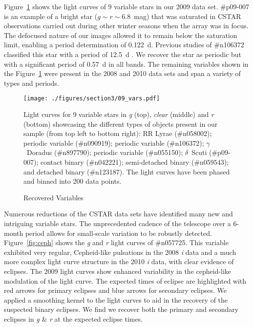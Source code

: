 Figure~\ref{fig:recover} shows the light curves of 9 variable stars in our 2009 data set. \#p09-007 is an example of a bright star ($g\sim r \sim 6.8$~mag) that was saturated in CSTAR observations carried out during other winter seasons when the array was in focus. The defocused nature of our images allowed it to remain below the saturation limit, enabling a period determination of 0.122~d. Previous studies of \#n106372 classified this star with a period of 12.5~d \citep{Wang2011}. We recover the star as periodic but with a significant period of 0.57~d in all bands. The remaining variables shown in the Figure~\ref{fig:recover} were present in the 2008 and 2010 data sets and span a variety of types and periods.

\begin{figure}[H]
\begin{center}
\singlespace
\texttt{[image: ./figures/section3/09\_vars.pdf]}
\end{center}
\singlespace
\caption{Recovered Variables}   Light curves for 9 variable stars in \textit{g} (top), \textit{clear} (middle) and \textit{r} (bottom) showcasing the different types of objects present in our sample (from top left to bottom right): RR Lyrae (\#n058002); periodic variable (\#n090919); periodic variable (\#n106372); $\gamma$~Doradus (\#n897790); periodic variable (\#n055150); $\delta$~Scuti (\#p09-007);  contact binary (\#n042221); semi-detached binary (\#n059543); and detached binary (\#n123187). The light curves have been phased and binned into 200 data points. \label{fig:recover}
\end{figure}

Numerous reductions of the CSTAR data sets have identified many new and intriguing variable stars. The unprecedented cadence of the telescope over a 6-month period allows for small-scale variation to be robustly detected.  Figure~\ref{fig:ceph} shows the \textit{g} and \textit{r} light curves of \#n057725. This variable exhibited very regular, Cepheid-like pulsations in the 2008 \textit{i} data and a much more complex light curve structure in the 2010 \textit{i} data, with clear evidence of eclipses. The 2009 light curves show enhanced variability in the cepheid-like modulation of the light curve. The expected times of eclipse are highlighted with red arrows for primary eclipses and blue arrows for secondary eclipses. We applied a smoothing kernel to the light curves to aid in the recovery of the suspected binary eclipses. We find we recover both the primary and secondary eclipses in \textit{g} $\&$ \textit{r} at the expected eclipse times.

